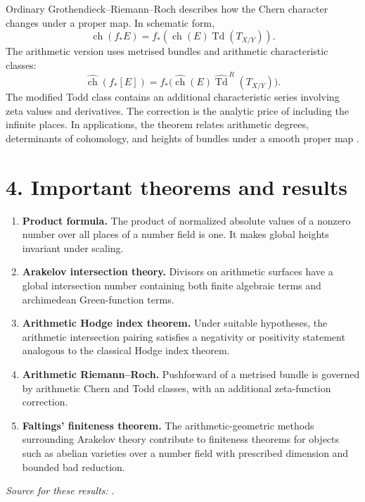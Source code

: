 Ordinary Grothendieck--Riemann--Roch describes how the Chern character changes under a proper map. In schematic form,
\[
 \operatorname{ch}(f_*E)=f_*(\operatorname{ch}(E)\operatorname{Td}(T_{X/Y})).
\]
The arithmetic version uses metrised bundles and arithmetic characteristic classes:
\[
 \widehat{\operatorname{ch}}(f_*[E])
 =f_*\bigl(\widehat{\operatorname{ch}}(E)
 \widehat{\operatorname{Td}}^{\,R}(T_{X/Y})\bigr).
\]
The modified Todd class contains an additional characteristic series involving zeta values and derivatives. The correction is the analytic price of including the infinite places. In applications, the theorem relates arithmetic degrees, determinants of cohomology, and heights of bundles under a smooth proper map \cite{arakelov_theory_ref6}.

\section*{4. Important theorems and results}
\begin{enumerate}[leftmargin=*,itemsep=0.35em]

\item \textbf{Product formula.} The product of normalized absolute values of a nonzero number over all places of a number field is one. It makes global heights invariant under scaling.

\item \textbf{Arakelov intersection theory.} Divisors on arithmetic surfaces have a global intersection number containing both finite algebraic terms and archimedean Green-function terms.

\item \textbf{Arithmetic Hodge index theorem.} Under suitable hypotheses, the arithmetic intersection pairing satisfies a negativity or positivity statement analogous to the classical Hodge index theorem.

\item \textbf{Arithmetic Riemann--Roch.} Pushforward of a metrised bundle is governed by arithmetic Chern and Todd classes, with an additional zeta-function correction.

\item \textbf{Faltings' finiteness theorem.} The arithmetic-geometric methods surrounding Arakelov theory contribute to finiteness theorems for objects such as abelian varieties over a number field with prescribed dimension and bounded bad reduction.
\end{enumerate}
\noindent\emph{Source for these results:} \cite{arakelov_theory_ref1}.

